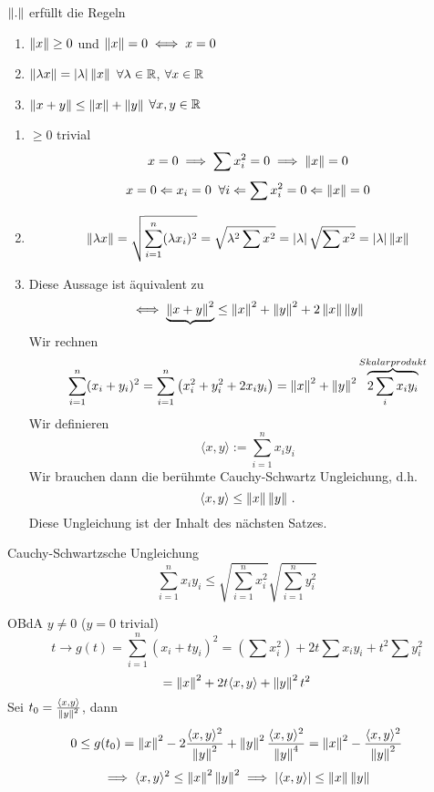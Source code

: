 \begin{Lem}\label{l:norm}
  $\left\| . \right\|$ erf\"ullt die Regeln
  \begin{enumerate}
    \item $\left\| x \right\|\geq 0$ und $\left\| x \right\|=0\iff x=0$
    \item $\left\| \lambda x \right\|=\left| \lambda \right|\left\| x \right\|$ $\forall \lambda\in\mathbb{R}$, $\forall x\in\mathbb{R}$
    \item $\left\| x+y \right\|\leq\left\| x \right\|+\left\| y \right\|$ $\forall x,y\in\mathbb{R}$
  \end{enumerate}
\end{Lem}
\begin{Bew}
  \begin{enumerate}
    \item $\geq 0$ trivial
      \[x=0\implies \sum x_i^2=0\implies \left\| x \right\|=0\]
      \[x=0\Leftarrow x_i=0\;\; \forall i\Leftarrow \sum x_i^2=0\Leftarrow \left\| x \right\|=0\]
    \item \[\left\| \lambda x \right\|=\sqrt{\sum^n_{i=1}(\lambda x_i)^2} = \sqrt{\lambda^2\sum x^2}=\left| \lambda \right|\sqrt{\sum x^2}=\left| \lambda \right|\left\| x \right\|\]
    \item Diese Aussage ist \"aquivalent zu
      \[\iff \underbrace{\left\| x+y \right\|^2}\leq \left\| x \right\|^2+\left\| y \right\|^2+2\left\| x \right\|\left\| y \right\|\]
Wir rechnen
      \[\sum_{i=1}^n(x_i+y_i)^2=\sum_{i=1}^n\left( x_i^2+y_i^2+2x_iy_i \right)=\left\| x \right\|^2+\left\| y \right\|^2\overbrace{2\sum_i x_iy_i}^{Skalarprodukt}\]
Wir definieren 
\[\langle x,y\rangle := \sum_{i=1}^n  x_iy_i\]
Wir brauchen dann die ber\"uhmte Cauchy-Schwartz Ungleichung, d.h.
      \[\langle x,y\rangle\leq \left\| x \right\|\left\| y \right\|\, .\]
Diese Ungleichung ist der Inhalt des n\"achsten Satzes.
  \end{enumerate}
\end{Bew}
\begin{Sat}{Cauchy-Schwartzsche Ungleichung}
  \[\sum^n_{i=1}x_iy_i\leq\sqrt{\sum_{i=1}^nx_i^2}\sqrt{\sum_{i=1}^ny_i^2}\]
\end{Sat}
\begin{Bew}
  OBdA $y\neq 0$ ($y=0$ trivial)
  \[t\to g(t)=\sum_{i=1}^n(x_i+ty_i)^2=\left( \sum x_i^2 \right)+2t\sum x_iy_i+t^2\sum y_i^2\]
  \[=\left\| x \right\|^2+2t\langle x,y \rangle+\left\| y \right\|^2t^2\]
  Sei $t_0=\frac{\langle x,y \rangle}{\left\| y \right\|^2}$, dann
  \[0\leq g(t_0)=\left\| x \right\|^2-2\frac{\langle x,y \rangle^2}{\left\| y \right\|^2}+\left\| y \right\|^2\frac{\langle x,y \rangle^2}{\left\| y \right\|^4}
 =\left\| x \right\|^2-\frac{\langle x,y \rangle^2}{\left\| y \right\|^2}\]
  \[\implies \langle x,y \rangle^2\leq\left\| x \right\|^2\left\| y \right\|^2\implies \left| \langle x,y \rangle \right|\leq\left\| x \right\|\left\| y \right\|\]
\end{Bew}
